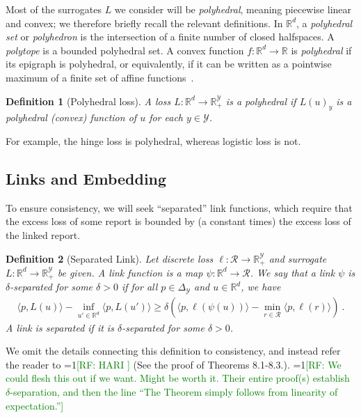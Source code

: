 \documentclass[12pt]{article}
\newcommand{\Comments}{1}
\newcommand{\mynote}[2]{\ifnum\Comments=1\textcolor{#1}{#2}\fi}
\newcommand{\raf}[1]{\mynote{green}{[RF: #1]}}
\newcommand{\reals}{\mathbb{R}}
\newcommand{\simplex}{\Delta_\Y}
\newcommand{\R}{\mathcal{R}}
\newcommand{\Y}{\mathcal{Y}}
\newcommand{\inprod}[2]{\langle #1, #2 \rangle}%
\newtheorem{definition}{Definition}
\begin{document}
Most of the surrogates $L$ we consider will be \emph{polyhedral}, meaning piecewise linear and convex; we therefore briefly recall the relevant definitions.
In $\reals^d$, a \emph{polyhedral set} or \emph{polyhedron} is the intersection of a finite number of closed halfspaces.
A \emph{polytope} is a bounded polyhedral set.
A convex function $f:\reals^d\to\reals$ is \emph{polyhedral} if its epigraph is polyhedral, or equivalently, if it can be written as a pointwise maximum of a finite set of affine functions~\citep{rockafellar1997convex}.
%
\begin{definition}[Polyhedral loss]
  A loss $L: \reals^d \to \reals^{\Y}_+$ is a \emph{polyhedral} if $L(u)_y$ is a polyhedral (convex) function of $u$ for each $y\in\Y$.
\end{definition}
%
For example, the hinge loss is polyhedral, whereas logistic loss is not.

\subsection{Links and Embedding}

To ensure consistency, we will seek ``separated'' link functions, which require that the excess loss of some report is bounded by (a constant times) the excess loss of the linked report.

\begin{definition}[Separated Link]\label{def:links}
  Let discrete loss $\ell:\R\to\reals^\Y_+$ and surrogate $L:\reals^d\to\reals^\Y_+$ be given.
  A \emph{link function} is a map $\psi:\reals^d\to\R$.
  We say that a link $\psi$ is \emph{$\delta$-separated} for some $\delta > 0$ if for all $p \in \simplex$ and $u\in\reals^d$, we have
  \begin{align*}
    \inprod{p}{L(u)} - \inf_{u' \in \reals^d} \inprod{p}{L(u')} \geq \delta\left(\inprod{p}{\ell(\psi(u))} - \min_{r \in \R} \inprod{p}{\ell(r)}\right)~.
  \end{align*}
  A link is \emph{separated} if it is $\delta$-separated for some $\delta>0$.
\end{definition}

We omit the details connecting this definition to consistency, and instead refer the reader to \raf{HARI \cite{ramaswamy2018consistent}} (See the proof of Theorems 8.1-8.3.).
\raf{We could flesh this out if we want.  Might be worth it.  Their entire proof(s) establish $\delta$-separation, and then the line ``The Theorem simply follows from linearity of expectation.''}
\end{document}
